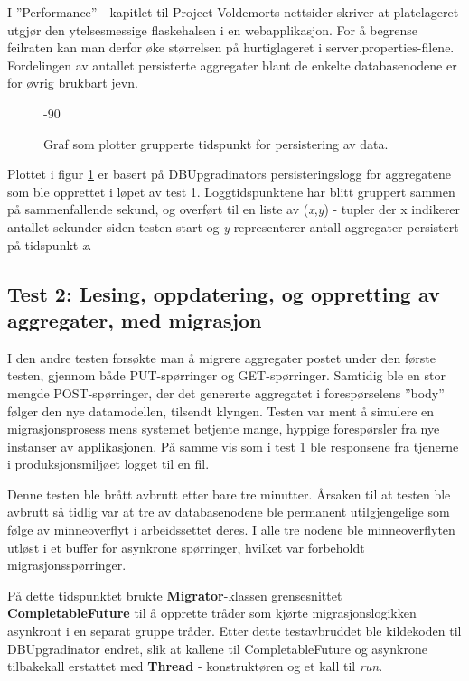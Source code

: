 I ''Performance'' - kapitlet til Project Voldemorts nettsider skriver \cite{kreps2009} at platelageret utgjør den ytelsesmessige flaskehalsen i en webapplikasjon. For å begrense feilraten kan man derfor øke størrelsen på hurtiglageret i server.properties-filene. Fordelingen av antallet persisterte aggregater blant de enkelte databasenodene er for øvrig brukbart jevn.

\begin{figure}[hbtp]
  \begin{turn}{-90}
    
  \end{turn}{-90}
  \caption{Graf som plotter grupperte tidspunkt for persistering av data.}
  \label{plott1}
\end{figure}

Plottet i figur \ref{plott1} er basert på DBUpgradinators persisteringslogg for aggregatene som ble opprettet  i løpet av test 1. Loggtidspunktene har blitt gruppert sammen på sammenfallende sekund, og overført til en liste av (\emph{x},\emph{y}) - tupler der x indikerer antallet sekunder siden testen start og \emph{y} representerer antall aggregater persistert på tidspunkt \emph{x}.

\subsection{Test 2: Lesing, oppdatering, og oppretting av aggregater, med migrasjon}

I den andre testen forsøkte man å migrere aggregater postet under den første testen, gjennom både PUT-spørringer og GET-spørringer. Samtidig ble en stor mengde POST-spørringer, der det genererte aggregatet i forespørselens ''body'' følger den nye datamodellen, tilsendt klyngen. Testen var ment å simulere en migrasjonsprosess mens systemet betjente mange, hyppige forespørsler fra nye instanser av applikasjonen. På samme vis som i test 1 ble responsene fra tjenerne i produksjonsmiljøet logget til en fil.




Denne testen ble brått avbrutt etter bare tre minutter. Årsaken til at testen ble avbrutt så tidlig var at tre av databasenodene ble permanent utilgjengelige som følge av minneoverflyt i arbeidssettet deres. I alle tre nodene ble minneoverflyten utløst i et buffer for asynkrone spørringer, hvilket var forbeholdt migrasjonsspørringer.

På dette tidspunktet brukte \textbf{Migrator}-klassen grensesnittet \textbf{CompletableFuture} til å opprette tråder som kjørte migrasjonslogikken asynkront i en separat gruppe tråder. Etter dette testavbruddet ble kildekoden til DBUpgradinator endret, slik at kallene til CompletableFuture og asynkrone tilbakekall erstattet med \textbf{Thread} - konstruktøren og et kall til \emph{run}.

